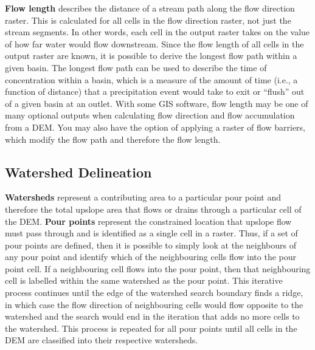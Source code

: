 \documentclass[
]{book}
\begin{document}
\textbf{Flow length} describes the distance of a stream path along the flow direction raster. This is calculated for all cells in the flow direction raster, not just the stream segments. In other words, each cell in the output raster takes on the value of how far water would flow downstream. Since the flow length of all cells in the output raster are known, it is possible to derive the longest flow path within a given basin. The longest flow path can be used to describe the time of concentration within a basin, which is a measure of the amount of time (i.e., a function of distance) that a precipitation event would take to exit or ``flush'' out of a given basin at an outlet. With some GIS software, flow length may be one of many optional outputs when calculating flow direction and flow accumulation from a DEM. You may also have the option of applying a raster of flow barriers, which modify the flow path and therefore the flow length.

\hypertarget{watershed-delineation}{%
\subsection{Watershed Delineation}\label{watershed-delineation}}

\textbf{Watersheds} represent a contributing area to a particular pour point and therefore the total upslope area that flows or drains through a particular cell of the DEM. \textbf{Pour points} represent the constrained location that upslope flow must pass through and is identified as a single cell in a raster. Thus, if a set of pour points are defined, then it is possible to simply look at the neighbours of any pour point and identify which of the neighbouring cells flow into the pour point cell. If a neighbouring cell flows into the pour point, then that neighbouring cell is labelled within the same watershed as the pour point. This iterative process continues until the edge of the watershed search boundary finds a ridge, in which case the flow direction of neighbouring cells would flow opposite to the watershed and the search would end in the iteration that adds no more cells to the watershed. This process is repeated for all pour points until all cells in the DEM are classified into their respective watersheds.
\end{document}

